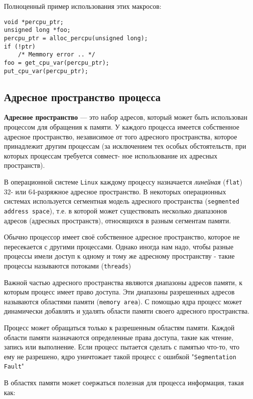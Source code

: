 \documentclass[12pt]{article}
\begin{document}
Полноценный пример использования этих макросов:

\begin{lstlisting}
void *percpu_ptr;
unsigned long *foo;
percpu_ptr = alloc_percpu(unsigned long);
if (!ptr)
    /* Memmory error .. */
foo = get_cpu_var(percpu_ptr);
put_cpu_var(percpu_ptr);
\end{lstlisting}

\pagebreak
\subsection*{Адресное пространство процесса}
\textbf{Адресное пространство} — это набор адресов, который может быть использован процессом для обращения к памяти. 
У каждого процесса имеется собственное адресное пространство, независимое от того адресного пространства, 
которое принадлежит другим процессам (за исключением тех особых обстоятельств, 
при которых процессам требуется совмест- ное использование их адресных пространств).

В операционной системе \verb!Linux! каждому процессу назначается \emph{линейная} (\verb!flat!) 32- или 64-разряжное адресное пространство.
В некоторых операционных системах используется сегментная модель адресного пространства (\verb!segmented address space!), т.е. 
в которой может существовать несколько диапазонов адресов (адресных пространств), относящихся в разным сегментам памяти.

Обычно процессор имеет своё собственное адресное пространство, которое не пересекается с другими процессами.
Однако иногда нам надо, чтобы разные процессы имели доступ к одному и тому же адресному пространству - такие процессы
называются потоками (\verb!threads!)

Важной частью адресного пространства являются диапазоны адресов памяти, к которым процесс имеет право доступа.
Эти диапазоны разрешенных адресов называются областями памяти (\verb!memory area!).
С помощью ядра процесс может динамически добавлять и удалять области памяти своего адресного пространства.

Процесс может обращаться только к разрешенным областям памяти.
Каждой области памяти назначаются определенные права доступа, такие как чтение, запись или выполнение.
Если процесс пытается сделать с памятью что-то, что ему не разрешено, ядро уничтожает такой процесс с ошибкой
"\verb!Segmentation Fault!"

В областях памяти может соержаться полезная для процесса информация, такая как:
\end{document}
